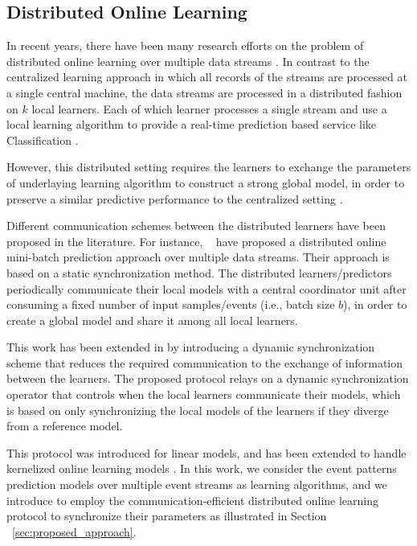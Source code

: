 
\subsection{Distributed Online Learning}

\par In recent years, there have been many research efforts on the problem of distributed online learning over multiple data streams \cite{tekin2014distributed,yan2013distributed,canzian2015ensemble,zhang2014fast,dekel2012optimal,kamp2014communication}.   In contrast to the centralized learning approach in which all records of the streams are processed at a single central machine, the data streams are processed in a distributed fashion on $k$ local learners. Each of which learner processes a single stream and use a local learning algorithm to provide a real-time prediction based service like Classification \cite{canzian2015ensemble}.  

\par However, this distributed setting requires the learners to exchange the parameters of underlaying learning algorithm to construct a strong global model, in order to preserve a similar predictive performance to the centralized setting \cite{kamp2014communication}. 

\par Different communication schemes between the distributed learners have been proposed in the literature. For instance, ~\citet{dekel2012optimal} have proposed a distributed online mini-batch prediction approach over multiple data streams. Their approach is based on a static synchronization method. The distributed learners/predictors periodically communicate  their local models with a central coordinator unit after consuming a fixed number of input samples/events (i.e., batch size $b$), in order to  create a global model  and share it among all local learners. 

\par This work has been extended in \cite{kamp2014communication} by introducing a dynamic synchronization scheme that reduces the required communication to the exchange of information between the learners. The proposed protocol relays on a dynamic synchronization operator that controls when the local learners communicate their models, which is based on only synchronizing the local models of the learners if they diverge from a reference model. 
 
\par This protocol was introduced for linear models, and has been extended to handle kernelized online learning models \cite{kamp2016communication}. In this work, we consider the event patterns prediction models over multiple event streams as learning algorithms, and we introduce to employ the communication-efficient distributed online learning protocol \cite{kamp2014communication} to synchronize their parameters as illustrated in Section ~\ref{sec:proposed_approach}. 
